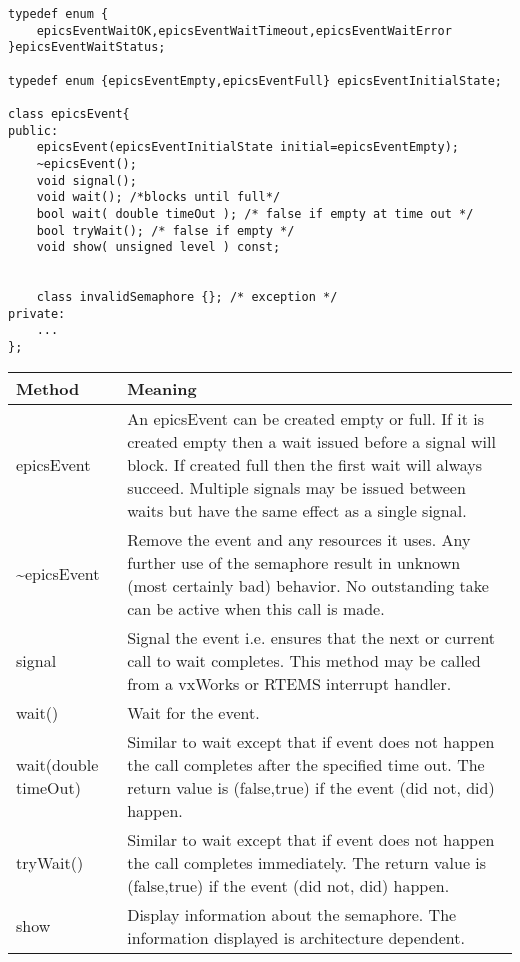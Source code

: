 \begin{verbatim}typedef enum {
    epicsEventWaitOK,epicsEventWaitTimeout,epicsEventWaitError
}epicsEventWaitStatus;

typedef enum {epicsEventEmpty,epicsEventFull} epicsEventInitialState;

class epicsEvent{
public:
    epicsEvent(epicsEventInitialState initial=epicsEventEmpty);
    ~epicsEvent();
    void signal();
    void wait(); /*blocks until full*/
    bool wait( double timeOut ); /* false if empty at time out */
    bool tryWait(); /* false if empty */
    void show( unsigned level ) const;


    class invalidSemaphore {}; /* exception */
private:
    ...
};
\end{verbatim}
\begin{center}\begin{longtable}{p{1.25in}p{5.0in}}
\textbf{Method} & \textbf{Meaning}\\
\hline
epicsEvent & An epicsEvent can be created empty or full. If it is created empty then a wait issued before a signal will block. If created full then the first wait will always succeed. Multiple signals may be issued between waits but have the same effect as a single signal.\\
\~{}epicsEvent & Remove the event and any resources it uses. Any further use of the semaphore result in unknown (most certainly bad) behavior. No outstanding take can be active when this call is made.\\
signal & Signal the event i.e. ensures that the next or current call to wait completes. This method may be called from a vxWorks or RTEMS interrupt handler.\\
wait() & Wait for the event.\\
wait(double timeOut) & Similar to wait except that if event does not happen the call completes after the specified time out. The return value is (false,true) if the event (did not, did) happen.\\
tryWait() & Similar to wait except that if event does not happen the call completes immediately. The return value is (false,true) if the event (did not, did) happen.\\
show & Display information about the semaphore. The information displayed is architecture dependent.
\end{longtable}\end{center}


